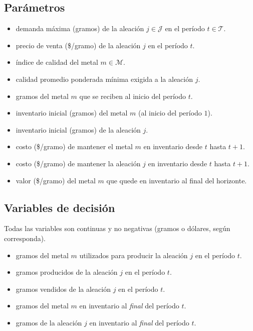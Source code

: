 \documentclass{article}
\begin{document}
\subsection*{Par\'ametros}
\begin{itemize}[leftmargin=2.2cm]
    \item[$d_{jt}$:] demanda m\'axima (gramos) de la aleaci\'on $j\in\mathcal{J}$ en el per\'iodo $t\in\mathcal{T}$.
    \item[$p_{jt}$:] precio de venta (\$/gramo) de la aleaci\'on $j$ en el per\'iodo $t$.
    \item[$r_m$:] \'indice de calidad del metal $m\in\mathcal{M}$.
    \item[$q_j$:] calidad promedio ponderada m\'inima exigida a la aleaci\'on $j$.
    \item[$a_{mt}$:] gramos del metal $m$ que se reciben al inicio del per\'iodo $t$.
    \item[$\widehat{\gamma}_m$:] inventario inicial (gramos) del metal $m$ (al inicio del per\'iodo $1$).
    \item[$\gamma_j$:] inventario inicial (gramos) de la aleaci\'on $j$.
    \item[$\widehat{h}_{mt}$:] costo (\$/gramo) de mantener el metal $m$ en inventario desde $t$ hasta $t+1$.
    \item[$h_{jt}$:] costo (\$/gramo) de mantener la aleaci\'on $j$ en inventario desde $t$ hasta $t+1$.
    \item[$v_m$:] valor (\$/gramo) del metal $m$ que quede en inventario al final del horizonte.
\end{itemize}

\subsection*{Variables de decisi\'on}
Todas las variables son continuas y no negativas (gramos o d\'olares, seg\'un corresponda).
\begin{itemize}[leftmargin=2.4cm]
    \item[$x_{mjt}$:] gramos del metal $m$ utilizados para producir la aleaci\'on $j$ en el per\'iodo $t$.
    \item[$y_{jt}$:] gramos producidos de la aleaci\'on $j$ en el per\'iodo $t$.
    \item[$w_{jt}$:] gramos vendidos de la aleaci\'on $j$ en el per\'iodo $t$.
    \item[$I^{M}_{mt}$:] gramos del metal $m$ en inventario al \emph{final} del per\'iodo $t$.
    \item[$I^{A}_{jt}$:] gramos de la aleaci\'on $j$ en inventario al \emph{final} del per\'iodo $t$.
\end{itemize}
\end{document}
